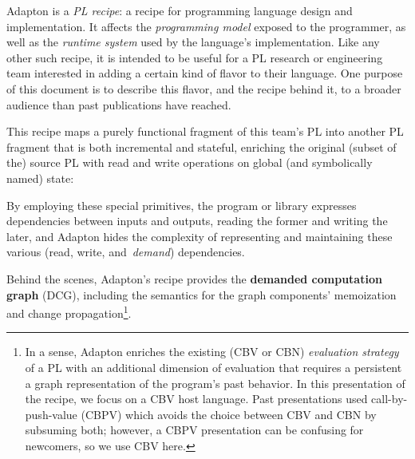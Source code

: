 \documentclass[11pt]{article}
\begin{document}
\noindent
Adapton is a \emph{PL recipe}: a recipe for programming language
design and implementation.
%
It affects the \emph{programming model} exposed to the
programmer, as well as the \emph{runtime system} used by the
language's implementation.
%
Like any other such recipe, it is intended to be useful for a PL
research or engineering team interested in adding a certain kind of
flavor to their language.
%
One purpose of this document is to describe this flavor, and the
recipe behind it, to a broader audience than past publications have
reached.

This recipe maps a purely functional fragment of this team's PL into
another PL fragment that is both incremental and stateful, enriching
the original (subset of the) source PL with read and write operations
on global (and symbolically named) state:

\begin{center}
\end{center}

\noindent
By employing these special primitives, the program or library
expresses dependencies between inputs and outputs, reading the former
and writing the later, and Adapton hides the complexity of
representing and maintaining these various (read, write,
and~\emph{demand}) dependencies.

Behind the scenes, Adapton's recipe provides the \textbf{demanded computation graph} (DCG),
including the semantics for the graph components'
memoization and change propagation\footnote{
In a sense, Adapton enriches the existing (CBV or CBN)
\emph{evaluation strategy} of a PL with an additional dimension of
evaluation that requires a persistent a graph representation of the
program's past behavior.
%
In this presentation of the recipe, we focus on a CBV host language.
%
Past presentations used call-by-push-value (CBPV) which avoids the
choice between CBV and CBN by subsuming both; however, a CBPV
presentation can be confusing for newcomers, so we use CBV here.
}.
\end{document}
